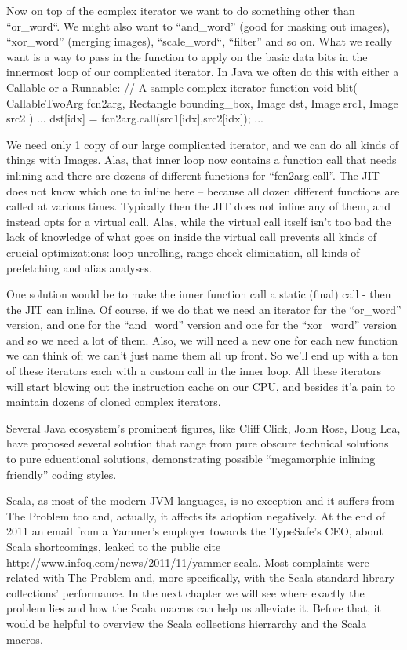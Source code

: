 Now on top of the complex iterator we want to do something other than “or_word“.
  We might also want to “and_word” (good for masking out images), “xor_word”
(merging images), “scale_word“,  “filter” and so on.  What we really want is a
way to pass in the function to apply on the basic data bits in the innermost
loop of our complicated iterator.  In Java we often do this with either a
Callable or a Runnable:
  // A sample complex iterator function
  void blit( CallableTwoArg fcn2arg, Rectangle bounding_box, Image dst, Image
src1, Image src2 ) {
    ...
      dst[idx] = fcn2arg.call(src1[idx],src2[idx]);
    ...
  }
  
We need only 1 copy of our large complicated iterator, and we can do all kinds
of things with Images.  Alas, that inner loop now contains a function call that
needs inlining and there are dozens of different functions for “fcn2arg.call”. 
The JIT does not know which one to inline here – because all dozen different
functions are called at various times.  Typically then the JIT does not inline
any of them, and instead opts for a virtual call.  Alas, while the virtual call
itself isn’t too bad the lack of knowledge of what goes on inside the virtual
call prevents all kinds of crucial optimizations: loop unrolling, range-check
elimination, all kinds of prefetching and alias analyses.

One solution  would be to make the inner function call a static (final) call -
then the JIT can inline. Of course, if we do that we need an iterator for the
“or_word” version, and one for the “and_word” version and one for the “xor_word”
version and so we need a lot of them. Also, we will need a new one for each
new function we can think of; we can't just name them all up front.  So we’ll
end up with a ton of these iterators each with a custom call in the inner loop.
All these iterators will start blowing out the instruction cache on our CPU, and
besides it'a pain to maintain dozens of cloned complex iterators.

Several Java ecosystem's prominent figures, like Cliff Click, John Rose, Doug
Lea, have proposed several solution that range from pure obscure technical
solutions to pure educational solutions, demonstrating possible ``megamorphic
inlining friendly'' coding styles.

Scala, as most of the modern JVM languages, is no exception and it suffers from
The Problem too and, actually, it affects its adoption negatively. At the end of
2011 an email from a Yammer's employer towards the TypeSafe's CEO, about Scala
shortcomings, leaked to the public {cite
http://www.infoq.com/news/2011/11/yammer-scala}. Most complaints were related
with The Problem and, more specifically, with the Scala standard
library collections' performance. In the next chapter we will see where exactly
the problem lies and how the Scala macros can help us alleviate it. Before
that, it would be helpful to overview the Scala collections hierrarchy and the
Scala macros.


